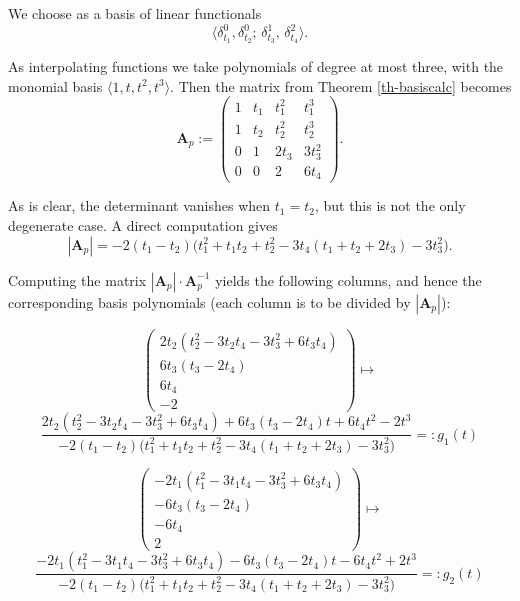 \documentclass{article}
\theoremstyle{definition}
\theoremstyle{definition}
\numberwithin{figure}{section}
\newcommand{\1}{\mathbf{1}}
\begin{document}
We choose as a basis of linear functionals
\[
    \langle \delta^0_{t_1}, \delta^0_{t_2};\, \delta^1_{t_3},\, \delta^2_{t_4} \rangle.
\]

As interpolating functions we take polynomials of degree at most three, with the monomial basis
\(\langle 1, t, t^2, t^3\rangle\). Then the matrix from Theorem \ref{th-basiscalc} becomes
\[
    \mathbf{A}_p := 
    \begin{pmatrix}
        1 & t_1 & t_1^2 & t_1^3\\
        1 & t_2 & t_2^2 & t_2^3\\
        0 & 1   & 2t_3  & 3t_3^2\\
        0 & 0   & 2     & 6t_4
    \end{pmatrix}.
\]

As is clear, the determinant vanishes when \(t_1=t_2\), but this is not the only degenerate case. A direct computation gives
\begin{equation}\label{eq-detAp}
|\mathbf{A}_p| = -2(t_1-t_2)\bigl(t_1^2+t_1t_2+t_2^2 - 3t_4(t_1+t_2+2t_3) - 3t_3^2 \bigr).
\end{equation}

Computing the matrix \(|\mathbf{A}_p|\cdot \mathbf{A}_p^{-1}\) yields the following columns, and hence the corresponding basis polynomials (each column is to be divided by \(|\mathbf{A}_p|\)):

\[
    \begin{pmatrix}
        2 t_2\!\left(t_2^2-3 t_2 t_4-3 t_3^2+6 t_3 t_4\right) \\
        6 t_3\!\left(t_3-2 t_4\right)\\
        6 t_4\\
        -2
    \end{pmatrix}
    \mapsto
\]
\[
   \frac{
        2 t_2\!\left(t_2^2-3 t_2 t_4-3 t_3^2+6 t_3 t_4\right) +
        6 t_3\!\left(t_3-2 t_4\right)t +
        6 t_4 t^2 
        - 2 t^3
   }{
        -2(t_1-t_2)\bigl(t_1^2+t_1t_2+t_2^2 -3t_4(t_1+t_2+2t_3) - 3 t_3^2\bigr)
   }
   =: g_1(t)
\]

\[
    \begin{pmatrix}
        -2 t_1\!\left(t_1^2-3 t_1 t_4-3 t_3^2+6 t_3 t_4\right)\\
        -6 t_3\!\left(t_3-2 t_4\right)\\
        -6 t_4\\
        2
    \end{pmatrix}
    \mapsto
\]
\[
   \frac{
        -2 t_1\!\left(t_1^2-3 t_1 t_4-3 t_3^2+6 t_3 t_4\right)
        - 6 t_3\!\left(t_3-2 t_4\right)t
        - 6 t_4 t^2
        + 2 t^3
   }{
        -2(t_1-t_2)\bigl(t_1^2+t_1t_2+t_2^2 -3t_4(t_1+t_2+2t_3) - 3 t_3^2\bigr)
   }
   =: g_2(t)
\]
\end{document}
